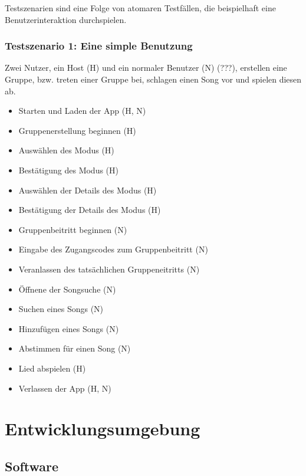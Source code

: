 \documentclass[oneside, ngerman]{sdqtechreport}
\begin{document}
Testszenarien sind eine Folge von atomaren Testfällen, die beispielhaft eine Benutzerinteraktion durchspielen.

\subsection{Testszenario 1: Eine simple Benutzung}
\label{subsec:Tests:Testszenarien:1}
Zwei Nutzer, ein Host (H) und ein normaler Benutzer (N) (???), erstellen eine Gruppe, bzw. treten einer Gruppe bei, schlagen einen Song vor und spielen diesen ab.

\begin{itemize}
    \item Starten und Laden der App (H, N)
    \item Gruppenerstellung beginnen (H)
    \item Auswählen des Modus (H)
    \item Bestätigung des Modus (H)
    \item Auswählen der Details des Modus (H)
    \item Bestätigung der Details des Modus (H)
    \item Gruppenbeitritt beginnen (N)
    \item Eingabe des Zugangscodes zum Gruppenbeitritt (N)
    \item Veranlassen des tatsächlichen Gruppeneitritts (N)
    \item Öffnene der Songsuche (N)
    \item Suchen eines Songs (N)
    \item Hinzufügen eines Songs (N)
    \item Abstimmen für einen Song (N)
    \item Lied abspielen (H)
    \item Verlassen der App (H, N)
\end{itemize}



\chapter{Entwicklungsumgebung}
\label{chap:Entwicklungsumgebung}

\section{Software}
\label{sec:Entwicklungsumgebung:Software}
\end{document}
